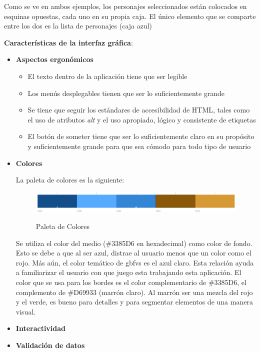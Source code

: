 Como se ve en ambos ejemplos, los personajes seleccionados están colocados en esquinas opuestas, cada uno en su propia caja. El único elemento que se comparte entre los dos es la lista de personajes (caja azul)

\textbf{Características de la interfaz gráfica}: 

\begin{itemize}
    \item \textbf{Aspectos ergonómicos}
    \begin{itemize}
        \item El texto dentro de la aplicación tiene que ser legible
        \item Los menús desplegables tienen que ser lo suficientemente grande
        \item Se tiene que seguir los estándares de accesibilidad de HTML, tales como el uso de atributos \textit{alt} y el uso apropiado, lógico y consistente de etiquetas
        \item El botón de someter tiene que ser lo suficientemente claro en su propósito y suficientemente grande para que sea cómodo para todo tipo de usuario
    \end{itemize}
    \item \textbf{Colores}
    
    La paleta de colores es la siguiente:
    \begin{figure}[ht!]
        \centering
        \caption{Paleta de Colores}
        \includegraphics[width=1.0\textwidth]{figures/pallete.png}
        \label{fig: pallete}
    \end{figure}

    Se utiliza el color del medio (\#3385D6 en hexadecimal) como color de fondo. Esto se debe a que al ser azul, distrae al usuario menos que un color como el rojo. Más aún, el color temático de \gls{gbfvs} es el azul claro. Esta relación ayuda a familiarizar el usuario con que juego esta trabajando esta aplicación. El color que se usa para los bordes es el color complementario de \#3385D6, el complemento de \#D69933 (marrón claro). Al marrón ser una mezcla del rojo y el verde, es bueno para detalles y para segmentar elementos de una manera visual.
    \item \textbf{Interactividad}
    \item \textbf{Validación de datos}
    

\end{itemize}
